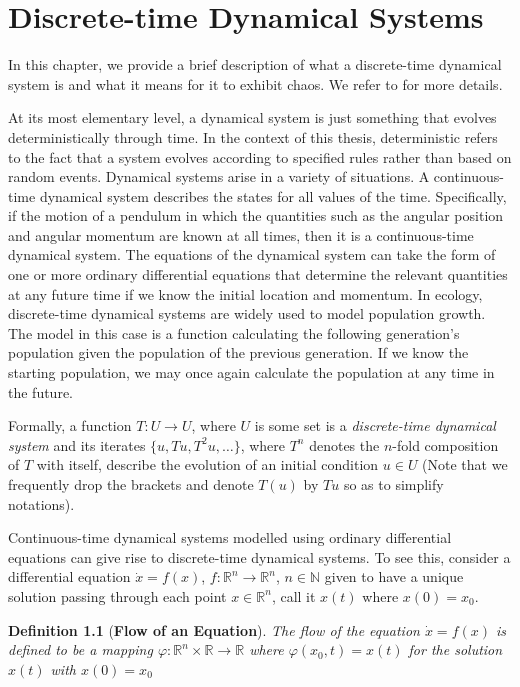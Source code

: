 \documentclass[a4paper,12pt,twoside]{report}
\newtheorem{Definition}{Definition}[]
\begin{document}
\chapter{Discrete-time Dynamical Systems}\label{ch2}

In this chapter, we provide a brief description of what a discrete-time dynamical system is and what it means for it to exhibit chaos. We refer to \cite{devaney2018introduction, de2013elements} for more details. 

At its most elementary level, a dynamical system is just something that evolves deterministically through time. In the context of this thesis, deterministic refers to the fact that a system evolves according to specified rules rather than based on random events. 
Dynamical systems arise in a variety of situations. A continuous-time dynamical system describes the states for all values of the time. Specifically, if the motion of a pendulum in which the quantities such as the angular position and angular momentum are known at all times, then it is a continuous-time dynamical system. The equations of the dynamical system can take the form of one or more ordinary differential equations that determine the relevant quantities at any future time if we know the initial location and momentum. 
In ecology, discrete-time dynamical systems are widely used to model population growth. The model in this case is a function calculating the following generation's population given the population of the previous generation. If we know the starting population, we may once again calculate the population at any time in the future. 

Formally, a function $T: U \to U$, where $U$ is some set is  a \emph{discrete-time dynamical system} and its iterates $\{u,Tu,T^2u,\ldots\}$, where $T^n$ denotes the $n$-fold composition of $T$ with itself, describe the evolution of an initial condition $u\in U$ (Note that we frequently drop the brackets and denote $T(u)$ by $Tu$ so as to simplify notations).  





Continuous-time dynamical systems modelled using ordinary differential equations can give rise to discrete-time dynamical systems. To see this, consider a differential equation $\dot{x} = f(x)$, $f: \mathbb{R}^n \to \mathbb{R}^n$, $n\in\mathbb{N}$ given to have a unique solution passing through 
each point $x\in\mathbb{R}^{n}$, call it $x(t)$ where $x(0)=x_0$. 

\begin{Definition}
  [\bf Flow of an Equation] \label{Dfn_Flow}\rm
  The flow of the equation  $\dot{x} = f(x)$  is defined to be a mapping $\varphi: \mathbb{R}^n \times \mathbb{R} \to \mathbb{R}$ where $\varphi(x_0,t)= x(t)$ for the solution $x(t)$ with $x(0)=x_0$ 
\end{Definition}
\end{document}
